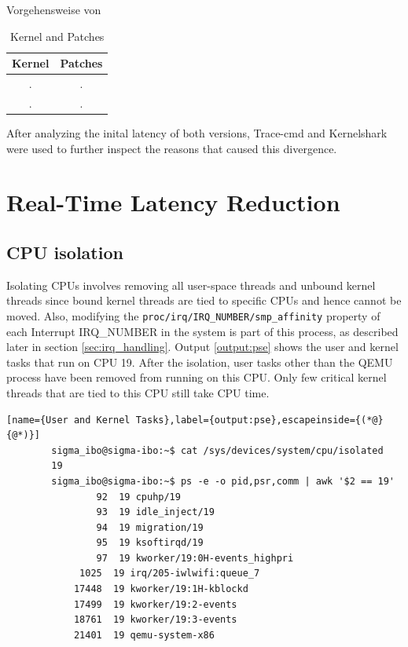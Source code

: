 \documentclass[MMR,Master,english]{twbook}
\begin{document}
Vorgehensweise von \cite{linPerformanceEvaluationXenomai}




\begin{table}[H]
	\centering
	\caption[Kernel and Patches]{Kernel and Patches}
	\label{tab:kernel_configuration}
	\begin{tabular}{|c|c|}
		\hline
		\textbf{Kernel} & \textbf{Patches} \\ \hline
		.               & .                \\ \hline
		.               & .                \\ \hline
	\end{tabular}
\end{table}

After analyzing the inital latency of both versions, Trace-cmd and Kernelshark were used to further inspect the reasons that caused this divergence.
\clearpage

\chapter{Real-Time Latency Reduction}\label{cha:latency_reduction}
\section{CPU isolation}
Isolating CPUs involves removing all user-space threads and unbound kernel threads since bound kernel threads are tied to specific CPUs and hence cannot be moved. Also, modifying the \texttt{proc/irq/IRQ\_NUMBER/smp\_affinity} property of each Interrupt IRQ\_NUMBER in the system is part of this process, as described later in section \ref{sec:irq_handling}. Output \ref{output:pse} shows the user and kernel tasks that run on CPU 19. After the isolation, user tasks other than the QEMU process have been removed from running on this CPU. Only few critical kernel threads that are tied to this CPU still take CPU time.

\vspace{1em}
\begin{minipage}{0.95\columnwidth}
	\begin{lstlisting}[name={User and Kernel Tasks},label={output:pse},escapeinside={(*@}{@*)}]
		sigma_ibo@sigma-ibo:~$ cat /sys/devices/system/cpu/isolated
		19
		sigma_ibo@sigma-ibo:~$ ps -e -o pid,psr,comm | awk '$2 == 19'
				92  19 cpuhp/19
				93  19 idle_inject/19
 	    		94  19 migration/19
 	    		95  19 ksoftirqd/19
 	    		97  19 kworker/19:0H-events_highpri
 	 		 1025  19 irq/205-iwlwifi:queue_7
 	 		17448  19 kworker/19:1H-kblockd
 	 		17499  19 kworker/19:2-events
 	 		18761  19 kworker/19:3-events
			21401  19 qemu-system-x86
\end{lstlisting}
\end{minipage}
\end{document}
